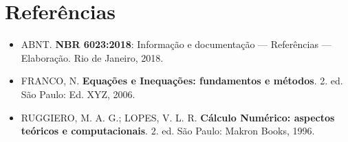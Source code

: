 \documentclass[12pt,a4paper]{article}
\begin{document}
\section*{Referências}
\begin{itemize}\itemsep0.3em
  \item ABNT. \textbf{NBR 6023:2018}: Informação e documentação — Referências — Elaboração. Rio de Janeiro, 2018.
  \item FRANCO, N. \textbf{Equações e Inequações: fundamentos e métodos}. 2. ed. São Paulo: Ed. XYZ, 2006.
  \item RUGGIERO, M. A. G.; LOPES, V. L. R. \textbf{Cálculo Numérico: aspectos teóricos e computacionais}. 2. ed. São Paulo: Makron Books, 1996.
\end{itemize}
\end{document}
